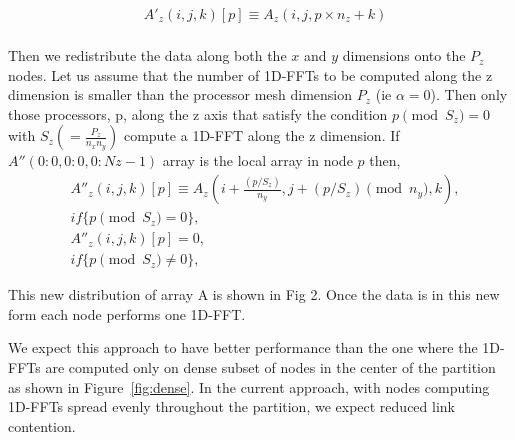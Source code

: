 \begin{eqnarray}
&A'_z(i,j,k)[p] \equiv A_z(i,j ,p \times  n_z+k)\\
\end{eqnarray}

Then we redistribute the data along both the $x$ and $y$ dimensions
onto the $P_z$ nodes. Let us assume that the number of 1D-FFTs to be
computed along the z dimension is smaller than the processor mesh
dimension $P_z$ (ie $\alpha=0$).  Then only those processors, p, along the z
axis that satisfy the condition $p \pmod {S_z} = 0$ with $S_z
(=\frac{P_z}{n_x n_y })$ compute a 1D-FFT along the z dimension. If
$A''(0:0,0:0, 0:Nz-1)$ array is the local array in node $p$ then,
\begin{eqnarray}
&A''_z(i,j,k)[p] \equiv A_z(i+\frac{ (p/S_z) }{n_y},j+(p/S_z)\pmod{n_y},k),\\
&if \{ p\pmod{S_z}=0 \}, \\
&A''_z(i,j,k)[p]=0,\\
&if \{ p\pmod{S_z}\ne 0\}, 
\end{eqnarray}
 
This new distribution of array A is shown in Fig 2. Once the data is
in this new form each node performs one 1D-FFT.

We expect this approach to have better performance than the one where
the 1D-FFTs are computed only on dense subset of nodes in the center
of the partition as shown in Figure~\ref{fig:dense}.  In the current
approach, with nodes computing 1D-FFTs spread evenly throughout the
partition, we expect reduced link contention.

